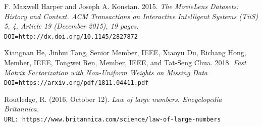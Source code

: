 \documentclass[10pt]{article}
\begin{document}
\begin{thebibliography}{9}
F. Maxwell Harper and Joseph A. Konstan. 2015. \textit{The MovieLens Datasets: History and Context. ACM Transactions on Interactive Intelligent Systems (TiiS) 5, 4, Article 19 (December 2015), 19 pages.}
\\\texttt{DOI=http://dx.doi.org/10.1145/2827872}

Xiangnan He, Jinhui Tang, Senior Member, IEEE, Xiaoyu Du, Richang Hong, Member, IEEE, Tongwei Ren, Member, IEEE, and Tat-Seng Chua. 2018. \textit{Fast Matrix Factorization with Non-Uniform Weights on Missing Data}
\\\texttt{DOI=https://arxiv.org/pdf/1811.04411.pdf}

Routledge, R. (2016, October 12). \textit{Law of large numbers. Encyclopedia Britannica.}
\\\texttt{URL: https://www.britannica.com/science/law-of-large-numbers}
\end{thebibliography}
\end{document}
